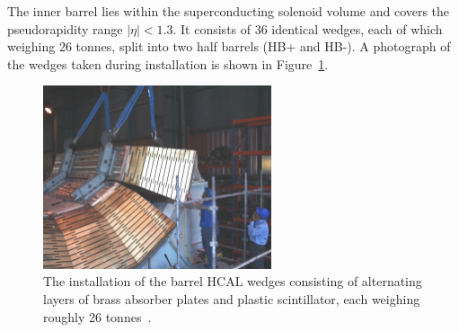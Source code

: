 The inner barrel lies within the superconducting solenoid volume and covers the pseudorapidity range $|\eta|<1.3$.
It consists of 36 identical wedges, each of which weighing 26 tonnes, split into two half barrels (HB+ and HB-).
A photograph of the wedges taken during installation is shown in Figure~\ref{fig:cms:hcal-wedges}. 

\begin{figure}[h] 
    \centering
    \includegraphics[width=0.6\textwidth]{figures/cms/hcal-2000-010_02.jpg}
    \caption{The installation of the barrel HCAL wedges consisting of alternating layers of brass absorber plates and plastic scintillator, each weighing roughly 26 tonnes~\cite{Veillet:41645}.}
    \label{fig:cms:hcal-wedges}
\end{figure}


